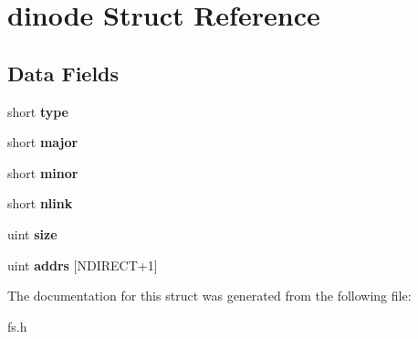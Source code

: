 \hypertarget{structdinode}{}\section{dinode Struct Reference}
\label{structdinode}
\subsection*{Data Fields}
\begin{DoxyCompactItemize}
\item 
short {\bfseries type}\hypertarget{structdinode_abf6b2a8476a803284f1c927fb3b82259}{}\label{structdinode_abf6b2a8476a803284f1c927fb3b82259}

\item 
short {\bfseries major}\hypertarget{structdinode_aca8272002020f48219df175c986db257}{}\label{structdinode_aca8272002020f48219df175c986db257}

\item 
short {\bfseries minor}\hypertarget{structdinode_ae97965f85e7353313f85035e8fc63495}{}\label{structdinode_ae97965f85e7353313f85035e8fc63495}

\item 
short {\bfseries nlink}\hypertarget{structdinode_a105562253b461c11413c9a229ef15358}{}\label{structdinode_a105562253b461c11413c9a229ef15358}

\item 
uint {\bfseries size}\hypertarget{structdinode_a990ad8ddf5f8c051fbbe95cf550d2164}{}\label{structdinode_a990ad8ddf5f8c051fbbe95cf550d2164}

\item 
uint {\bfseries addrs} \mbox{[}N\+D\+I\+R\+E\+CT+1\mbox{]}\hypertarget{structdinode_a705729b3a39c10c0ba6927fc5e4e0563}{}\label{structdinode_a705729b3a39c10c0ba6927fc5e4e0563}

\end{DoxyCompactItemize}


The documentation for this struct was generated from the following file\+:\begin{DoxyCompactItemize}
\item 
fs.\+h\end{DoxyCompactItemize}
